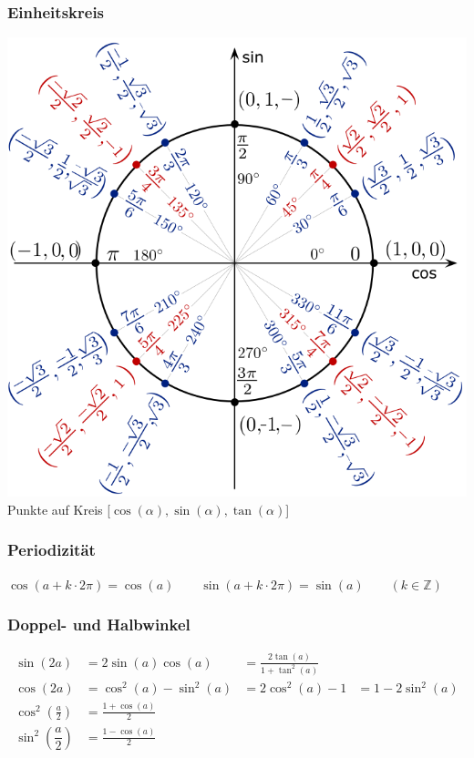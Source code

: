 \subsubsection{Einheitskreis}
\begin{center}
	\includegraphics[width=0.8\columnwidth]{Images/einheitskreis}\\
	Punkte auf Kreis [$\cos(\alpha), \sin(\alpha), \tan(\alpha)$]
\end{center}

\subsubsection{Periodizität}
$\cos(a+k\cdot2\pi)=\cos(a) \qquad \sin(a+k\cdot2\pi)=\sin(a) \qquad
(k \in \mathbb{Z})$

\subsubsection{Doppel- und Halbwinkel}	
\begin{align*}
	\sin(2a) &=2\sin(a)\cos(a) &= \frac{2\tan(a)}{1 +\tan^2(a)}\\
	\cos(2a) &=\cos^2(a)-\sin^2(a) &= 2\cos^2(a)-1 &= 1-2\sin^2(a)\\
	\cos^2 \left(\frac{a}{2}\right) &=\frac{1+\cos(a)}{2} \\
	\sin^2 \left(\dfrac{a}{2}\right)&=\frac{1-\cos(a)}{2}
\end{align*}


